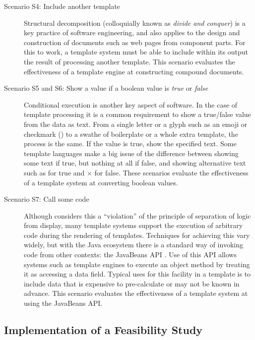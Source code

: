 \begin{description}
\item[Scenario S4: Include another template] \hfill

Structural decomposition (colloquially known as \emph{divide and conquer}) is a key practice of software engineering, and also applies to the design and construction of documents such as web pages from component parts. For this to work, a template system must be able to include within its output the result of processing another template. This scenario evaluates the effectiveness of a \gls{template engine} at constructing compound documents.

\item[Scenario S5 and S6: Show a value if a boolean value is \emph{true} or \emph{false}] \hfill

Conditional execution is another key aspect of software. In the case of template processing it is a common requirement to show a true/false value from the data as text. From a single letter or a glyph such as an emoji or checkmark (\checkmark) to a swathe of boilerplate or a whole extra template, the process is the same. If the value is true, show the specified text. Some \gls{template language}s make a big issue of the difference between showing some text if true, but nothing at all if false, and showing alternative text such as \checkmark for true and $\times$ for false. These scenarios evaluate the effectiveness of a template system at converting boolean values.

\item[Scenario S7: Call some code] \hfill

Although \citeauthor{Parr2004} considers this a \enquote{violation} of the principle of separation of logic from display, many template systems support the execution of arbitrary code during the rendering of templates. Techniques for achieving this vary widely, but with the Java ecosystem there is a standard way of invoking code from other contexts: the \gls{JavaBeans} API \citep{Oracle2018JavaBean}. Use of this API allows systems such as \gls{template engine}s to execute an object method by treating it as accessing a data field. Typical uses for this facility in a template is to include data that is expensive to pre-calculate or may not be known in advance. This scenario evaluates the effectiveness of a template system at using the \gls{JavaBeans} API.

\end{description}

\subsection{Implementation of a Feasibility Study}
\label{fs:implementation}

